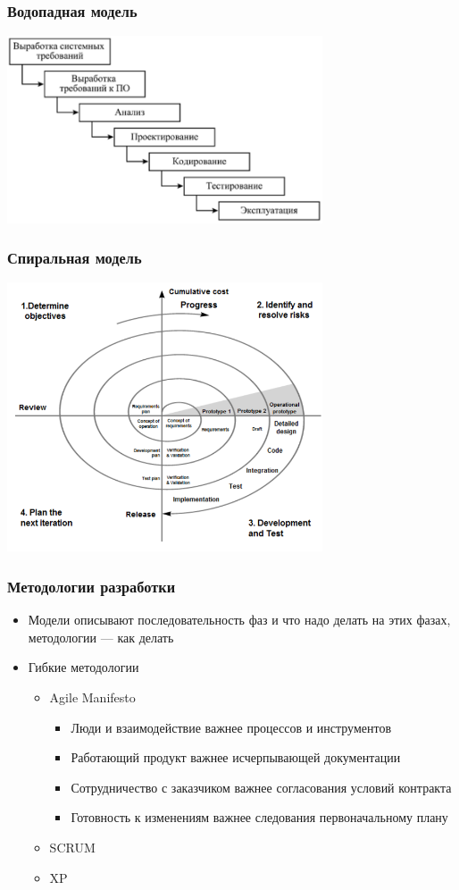 \documentclass[xetex,mathserif,serif]{beamer}
\begin{document}
	\begin{frame}
		\frametitle{Водопадная модель}
		\begin{center}
			\includegraphics[width=0.7\textwidth]{waterfall-model.png}
		\end{center}
	\end{frame}

	\begin{frame}
		\frametitle{Спиральная модель}
		\begin{center}
			\includegraphics[width=0.7\textwidth]{spiral-model.png}
		\end{center}
	\end{frame}

	\begin{frame}
		\frametitle{Методологии разработки}
		\begin{itemize}
			\item Модели описывают последовательность фаз и что надо делать на этих фазах, методологии --- как делать
			\item Гибкие методологии
			\begin{itemize}
				\item Agile Manifesto
				\begin{itemize}
					\item Люди и взаимодействие важнее процессов и инструментов
					\item Работающий продукт важнее исчерпывающей документации
					\item Сотрудничество с заказчиком важнее согласования условий контракта
					\item Готовность к изменениям важнее следования первоначальному плану
				\end{itemize}
				\item SCRUM
				\item XP
			\end{itemize}
		\end{itemize}
	\end{frame}
\end{document}
